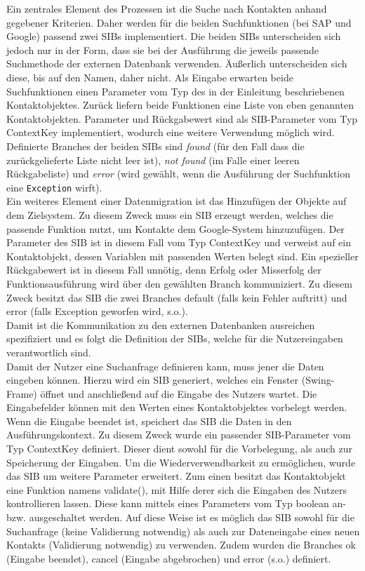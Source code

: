 Ein zentrales Element des Prozessen ist die Suche nach Kontakten anhand gegebener Kriterien. Daher werden für die beiden Suchfunktionen (bei SAP und Google) passend zwei SIBs implementiert. Die beiden SIBs unterscheiden sich jedoch nur in der Form, dass sie bei der Ausführung die jeweils passende Suchmethode der externen Datenbank verwenden. Äußerlich unterscheiden sich diese, bis auf den Namen, daher nicht. Als Eingabe erwarten beide Suchfunktionen einen Parameter vom Typ des in der Einleitung beschriebenen Kontaktobjektes. Zurück liefern beide Funktionen eine Liste von eben genannten Kontaktobjekten. Parameter und Rückgabewert sind als SIB-Parameter vom Typ ContextKey implementiert, wodurch eine weitere Verwendung möglich wird. Definierte Branches der beiden SIBs sind \textit{found} (für den Fall dass die zurückgelieferte Liste nicht leer ist), \textit{not found} (im Falle einer leeren Rückgabeliste) und \textit{error} (wird gewählt, wenn die Ausführung der Suchfunktion eine \texttt{Exception} wirft).\\

Ein weiteres Element einer Datenmigration ist das Hinzufügen der Objekte auf dem Zielsystem. Zu diesem Zweck muss ein SIB erzeugt werden, welches die passende Funktion nutzt, um Kontakte dem Google-System hinzuzufügen. Der Parameter des SIB ist in diesem Fall vom Typ ContextKey und verweist auf ein Kontaktobjekt, dessen Variablen mit passenden Werten belegt sind. Ein spezieller Rückgabewert ist in diesem Fall unnötig, denn Erfolg oder Misserfolg der Funktionsausführung wird über den gewählten Branch kommuniziert. Zu diesem Zweck besitzt das SIB die zwei Branches default (falls kein Fehler auftritt) und error (falls Exception geworfen wird, s.o.).\\

Damit ist die Kommunikation zu den externen Datenbanken ausreichen spezifiziert und es folgt die Definition der SIBs, welche für die Nutzereingaben verantwortlich sind.\\

Damit der Nutzer eine Suchanfrage definieren kann, muss jener die Daten eingeben können. Hierzu wird ein SIB generiert, welches ein Fenster (Swing-Frame) öffnet und anschließend auf die Eingabe des Nutzers wartet. Die Eingabefelder können mit den Werten eines Kontaktobjektes vorbelegt werden. Wenn die Eingabe beendet ist, speichert das SIB die Daten in den Ausführungskontext. Zu diesem Zweck wurde ein passender SIB-Parameter vom Typ ContextKey definiert. Dieser dient sowohl für die Vorbelegung, als auch zur Speicherung der Eingaben. Um die Wiederverwendbarkeit zu ermöglichen, wurde das SIB um weitere Parameter erweitert. Zum einen besitzt das Kontaktobjekt eine Funktion namens validate(), mit Hilfe derer sich die Eingaben des Nutzers kontrollieren lassen. Diese kann mittels eines Parameters vom Typ boolean an- bzw. ausgeschaltet werden. Auf diese Weise ist es möglich das SIB sowohl für die Suchanfrage (keine Validierung notwendig) als auch zur Dateneingabe eines neuen Kontakts (Validierung notwendig) zu verwenden. Zudem wurden die Branches ok (Eingabe beendet), cancel (Eingabe abgebrochen) und error (s.o.) definiert.\\

